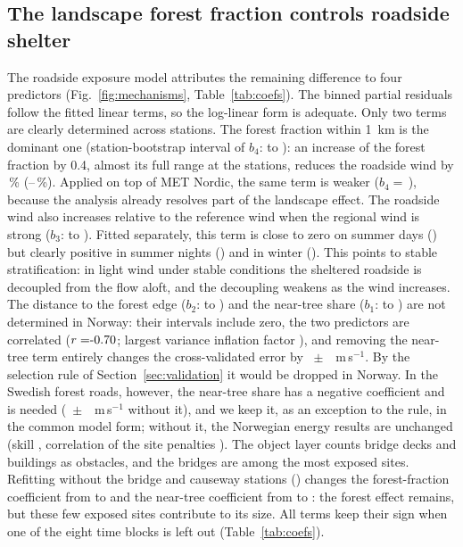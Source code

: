 \subsection{The landscape forest fraction controls roadside shelter}
\label{sec:res-model}
The roadside exposure model attributes the remaining difference to four predictors (Fig.~\ref{fig:mechanisms}, Table~\ref{tab:coefs}). The binned partial residuals follow the fitted linear terms, so the log-linear form is adequate. Only two terms are clearly determined across stations. The forest fraction within \SI{1}{km} is the dominant one (station-bootstrap interval of $b_4$: \noBFarLo{} to \noBFarHi): an increase of the forest fraction by 0.4, almost its full range at the stations, reduces the roadside wind by \noFarFortyPct\,\% (\noFarFortyLo--\noFarFortyHi\,\%). Applied on top of MET Nordic, the same term is weaker ($b_4={}$\,\noHybFar), because the analysis already resolves part of the landscape effect. The roadside wind also increases relative to the reference wind when the regional wind is strong ($b_3$: \noBUnetLo{} to \noBUnetHi). Fitted separately, this term is close to zero on summer days (\noUnetDay) but clearly positive in summer nights (\noUnetNight) and in winter (\noUnetWinter). This points to stable stratification: in light wind under stable conditions the sheltered roadside is decoupled from the flow aloft, and the decoupling weakens as the wind increases. The distance to the forest edge ($b_2$: \noBXhLo{} to \noBXhHi) and the near-tree share ($b_1$: \noBTreeLo{} to \noBTreeHi) are not determined in Norway: their intervals include zero, the two predictors are correlated ($r=\noCorrTreeXh$; largest variance inflation factor \noVifMax), and removing the near-tree term entirely changes the cross-validated error by \noNoTree~$\pm$~\noNoTreeSE~m\,s$^{-1}$. By the selection rule of Section~\ref{sec:validation} it would be dropped in Norway. In the Swedish forest roads, however, the near-tree share has a negative coefficient and is needed (\seNoTree~$\pm$~\seNoTreeSE~m\,s$^{-1}$ without it), and we keep it, as an exception to the rule, in the common model form; without it, the Norwegian energy results are unchanged (skill \enSsNoCorNoTree, correlation of the site penalties \enRoadCorrNoCorNoTree). The object layer counts bridge decks and buildings as obstacles, and the bridges are among the most exposed sites. Refitting without the \noBridgeN{} bridge and causeway stations (\noBridgeList) changes the forest-fraction coefficient from \noBFar{} to \noBFarNoBridge{} and the near-tree coefficient from \noBTree{} to \noBTreeNoBridge: the forest effect remains, but these few exposed sites contribute to its size. All terms keep their sign when one of the eight time blocks is left out (Table~\ref{tab:coefs}).

